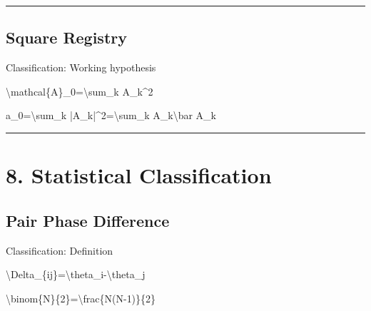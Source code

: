 \documentclass[
  a4paper]{article}
\newenvironment{Shaded}{}{}
\newcommand{\NormalTok}[1]{#1}
\begin{document}
\begin{center}\rule{0.5\linewidth}{0.5pt}\end{center}

\subsection{Square Registry}\label{square-registry}

Classification: Working hypothesis

\begin{Shaded}
\begin{Highlighting}[]
\NormalTok{\textbackslash{}mathcal\{A\}\_0=\textbackslash{}sum\_k A\_k\^{}2}
\end{Highlighting}
\end{Shaded}

\begin{Shaded}
\begin{Highlighting}[]
\NormalTok{a\_0=\textbackslash{}sum\_k |A\_k|\^{}2=\textbackslash{}sum\_k A\_k\textbackslash{}bar A\_k}
\end{Highlighting}
\end{Shaded}

\begin{center}\rule{0.5\linewidth}{0.5pt}\end{center}

\section{8. Statistical
Classification}\label{statistical-classification}

\subsection{Pair Phase Difference}\label{pair-phase-difference}

Classification: Definition

\begin{Shaded}
\begin{Highlighting}[]
\NormalTok{\textbackslash{}Delta\_\{ij\}=\textbackslash{}theta\_i{-}\textbackslash{}theta\_j}
\end{Highlighting}
\end{Shaded}

\begin{Shaded}
\begin{Highlighting}[]
\NormalTok{\textbackslash{}binom\{N\}\{2\}=\textbackslash{}frac\{N(N{-}1)\}\{2\}}
\end{Highlighting}
\end{Shaded}
\end{document}

